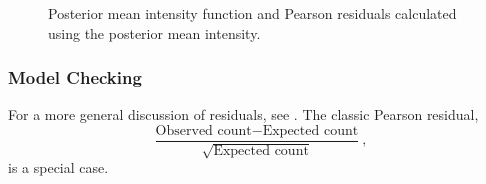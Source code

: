 \documentclass[]{interact}
\begin{document}
\begin{figure}[h]




\caption{Posterior mean intensity function and Pearson residuals calculated
using the posterior mean intensity.}
\label{beiintensity}
\end{figure}


\subsubsection{Model Checking}

For a more general discussion of residuals, see \cite{baddeleyresiduals}. The
classic Pearson residual,
\begin{displaymath}
\frac{\text{Observed count} - \text{Expected count}}
{\sqrt{\text{Expected count}}},
\end{displaymath}
is a special case.
\end{document}
